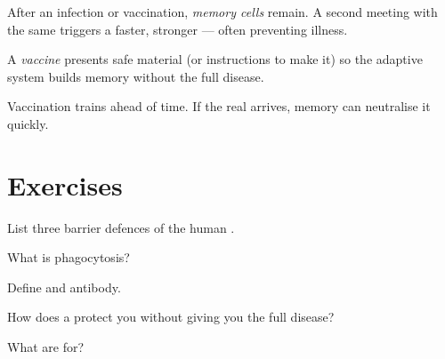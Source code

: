 \begin{definition}[Memory]\label{def:g8:immune:memory}
After an infection or vaccination, \emph{memory cells} remain. A second meeting with the same  triggers a
faster, stronger  --- often preventing illness.
\end{definition}

\begin{definition}[Vaccine]\label{def:g8:immune:vaccine}
A \emph{vaccine} presents safe  material (or
instructions to make it) so the adaptive system builds memory without the
full disease.
\end{definition}

\begin{proposition}\label{prop:g8:immune:vax}
Vaccination trains  ahead of time. If the real 
arrives, memory  can neutralise it quickly.
\end{proposition}
\admitted

\section{Exercises}

\begin{exercise}[$\star$]\label{exo:g8:immune:1}
List three barrier defences of the human .
\end{exercise}

\begin{exercise}[$\star$]\label{exo:g8:immune:2}
What is phagocytosis?
\end{exercise}

\begin{exercise}[$\star$]\label{exo:g8:immune:3}
Define  and antibody.
\end{exercise}

\begin{exercise}[$\star$]\label{exo:g8:immune:4}
How does a  protect you without giving you the full disease?
\end{exercise}

\begin{exercise}[$\star$]\label{exo:g8:immune:5}
What are  for?
\end{exercise}

